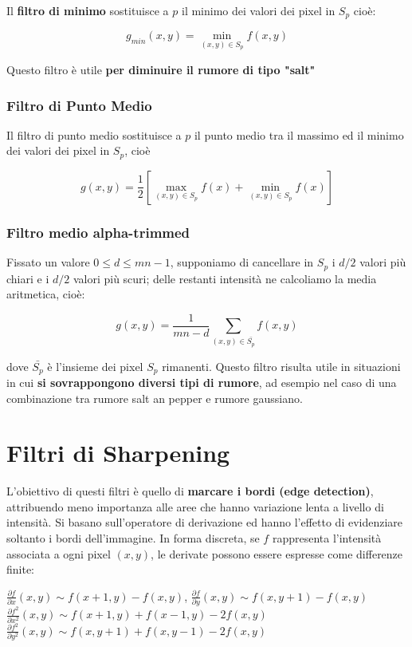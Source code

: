 Il \textbf{filtro di minimo} sostituisce a $p$ il minimo dei valori dei pixel in $S_p$ cioè:

$$
    g_{min}(x,y) = \min_{(x,y) \in S_p} f(x,y)
$$

Questo filtro è utile \textbf{per diminuire il rumore di tipo "salt"}

\subsubsection{Filtro di Punto Medio}

Il filtro di punto medio sostituisce a $p$ il punto medio tra il massimo ed il minimo
dei valori dei pixel in $S_p$, cioè

$$
    g(x,y) = \frac{1}{2} \left[\max_{(x,y) \in S_p} f(x) + \min_{(x,y) \in S_p} f(x)\right]
$$

\subsubsection{Filtro medio alpha-trimmed}

Fissato un valore $0 \le d \le mn - 1$, supponiamo di cancellare in $S_p$ i $d/2$ valori più chiari e i $d/2$ valori più scuri; delle
restanti intensità ne calcoliamo la media aritmetica, cioè:

$$
    g(x,y) = \frac{1}{mn-d} \sum_{(x,y) \in \bar{S_p}} f(x,y)
$$

dove $\bar{S_p}$ è l'insieme dei pixel $S_p$ rimanenti.
Questo filtro risulta utile in situazioni in cui \textbf{si sovrappongono diversi tipi di rumore}, ad esempio nel caso di una combinazione tra
rumore salt an pepper e rumore gaussiano.

\section{Filtri di Sharpening}

L'obiettivo di questi filtri è quello di \textbf{marcare i bordi (edge
    detection)}, attribuendo meno importanza alle aree che hanno variazione lenta a
livello di intensità. Si basano sull'operatore di derivazione ed hanno l'effetto
di evidenziare soltanto i bordi dell'immagine. In forma discreta, se $f$
rappresenta l'intensità associata a ogni pixel $(x,y)$, le derivate possono
essere espresse come differenze finite:

\begin{center}
    $\frac{\partial{f}}{\partial{x}}(x,y) \sim f(x+1, y) - f(x, y)$, $\frac{\partial{f}}{\partial{y}}(x,y) \sim f(x,y+1) - f(x,y)$
    \\
    $\frac{\partial{f^2}}{\partial{x^2}}(x,y) \sim f(x+1,y) + f(x-1, y) - 2f(x,y)$
    \\
    $\frac{\partial{f^2}}{\partial{y^2}}(x,y) \sim f(x,y+1) + f(x, y-1) - 2f(x,y)$
\end{center}

